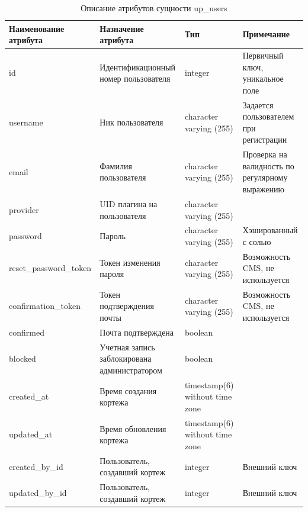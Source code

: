 \documentclass{mirea}
\begin{document}
	\begin{longtable}{ |p{}|p{}|p{}|p{}| } 
		\caption{Описание атрибутов сущности up\_users}
		\endfirsthead
		\endhead
		\hline
		Наименование атрибута & Назначение атрибута & Тип & Примечание \\ \hline
		
		id & Идентификацион\-ный номер пользователя & integer & Первичный ключ, уникальное поле \\ \hline
		
		username & Ник пользователя & character varying (255) & Задается пользователем при регистрации \\ \hline
		
		email & Фамилия пользователя & character varying (255) & Проверка на валидность по регулярному выражению \\ \hline
		
		provider & UID плагина на пользователя & character varying (255) &  \\ \hline
		
		password & Пароль & character varying (255) & Хэшированный с солью \\ \hline	
		
		reset\_password\_token & Токен изменения пароля & character varying (255) & Возможность CMS, не используется \\ \hline
		
		confirmation\_token & Токен подтверждения почты & character varying (255) & Возможность CMS, не используется \\ \hline
		
		confirmed & Почта подтверждена & boolean & \\ \hline
		
		blocked & Учетная запись заблокирована администратором & boolean & \\ \hline
		
		created\_at & Время создания кортежа & timestamp(6) without time zone & \\ \hline
		
		updated\_at & Время обновления кортежа & timestamp(6) without time zone & \\ \hline
		
		created\_by\_id & Пользователь, создавший кортеж & integer & Внешний ключ \\ \hline
		
		updated\_by\_id & Пользователь, создавший кортеж & integer & Внешний ключ \\ \hline
		
	\end{longtable}
\end{document}
